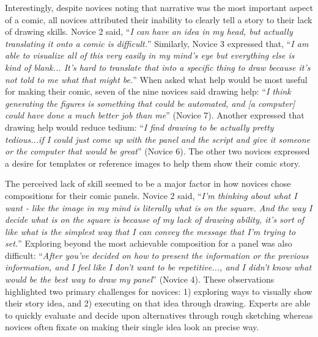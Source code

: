 Interestingly, despite novices noting that narrative was the most important aspect of a comic, all novices attributed their inability to clearly tell a story to their lack of drawing skills. Novice 2 said, ``\textit{I can have an idea in my head, but actually translating it onto a comic is difficult.}'' Similarly, Novice 3 expressed that, ``\textit{I am able to visualize all of this very easily in my mind’s eye but everything else is kind of blank... It’s hard to translate that into a specific thing to draw because it’s not told to me what that might be.}'' When asked what help would be most useful for making their comic, seven of the nine novices said drawing help: ``\textit{I think generating the figures is something that could be automated, and [a computer] could have done a much better job than me}'' (Novice 7). Another expressed that drawing help would reduce tedium: ``\textit{I find drawing to be actually pretty tedious...if I could just come up with the panel and the script and give it someone or the computer that would be great}'' (Novice 6). The other two novices expressed a desire for templates or reference images to help them show their comic story.

The perceived lack of skill seemed to be a major factor in how novices chose compositions for their comic panels.
Novice 2 said, ``\textit{I'm thinking about what I want - like the image in my mind is literally what is on the square. And the way I decide what is on the square is because of my lack of drawing ability, it’s sort of like what is the simplest way that I can convey the message that I'm trying to set.}'' Exploring beyond the most achievable composition for a panel was also difficult: ``\textit{After you’ve decided on how to present the information or the previous information, and I feel like I don’t want to be repetitive..., and I didn’t know what would be the best way to draw my panel}'' (Novice 4). These observations highlighted two primary challenges for novices: 1) exploring ways to visually show their story idea, and 2) executing on that idea through drawing. Experts are able to quickly evaluate and decide upon alternatives through rough sketching whereas novices often fixate on making their single idea look an precise way. 

